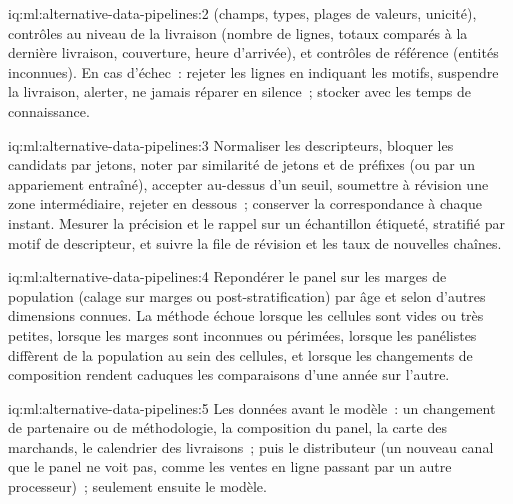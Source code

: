 \begin{solution}{iq:ml:alternative-data-pipelines:2}
 (champs, types, plages de valeurs, unicité), contrôles au niveau de la livraison (nombre de lignes, totaux comparés à la dernière livraison, couverture, heure d'arrivée),
et contrôles de référence (entités inconnues). En cas d'échec~: rejeter les lignes en indiquant les motifs, suspendre la livraison, alerter,
ne jamais réparer en silence~; stocker avec les temps de connaissance.
\end{solution}

\begin{solution}{iq:ml:alternative-data-pipelines:3}
Normaliser les descripteurs, bloquer les candidats par jetons, noter par similarité de jetons et de préfixes (ou par un appariement entraîné), accepter
au-dessus d'un seuil, soumettre à révision une zone intermédiaire, rejeter en dessous~; conserver la correspondance à chaque instant.
Mesurer la précision et le rappel sur un échantillon étiqueté, stratifié par motif de descripteur, et suivre la file de révision et les taux de nouvelles chaînes.
\end{solution}

\begin{solution}{iq:ml:alternative-data-pipelines:4}
Repondérer le panel sur les marges de population (calage sur marges ou post-stratification) par âge et selon d'autres dimensions connues. La méthode échoue
lorsque les cellules sont vides ou très petites, lorsque les marges sont inconnues ou périmées, lorsque les panélistes diffèrent de la population au sein des cellules, et
lorsque les changements de composition rendent caduques les comparaisons d'une année sur l'autre.
\end{solution}

\begin{solution}{iq:ml:alternative-data-pipelines:5}
Les données avant le modèle~: un changement de partenaire ou de méthodologie, la composition du panel, la carte des marchands, le calendrier des livraisons~; puis le distributeur
(un nouveau canal que le panel ne voit pas, comme les ventes en ligne passant par un autre processeur)~; seulement ensuite le modèle.
\end{solution}

